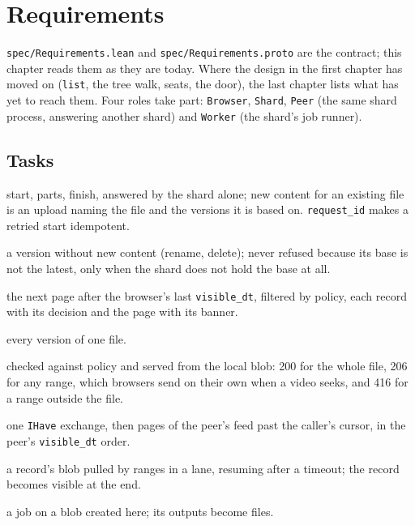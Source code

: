 \documentclass[11pt,oneside]{book}
\providecommand{\tightlist}{\setlength{\itemsep}{0pt}\setlength{\parskip}{0pt}}
\begin{document}


\chapter{Requirements}
\texttt{spec/Requirements.lean} and \texttt{spec/Requirements.proto} are the
contract; this chapter reads them as they are today. Where the design in the
first chapter has moved on (\texttt{list}, the tree walk, seats, the door), the
last chapter lists what has yet to reach them. Four roles take part: \texttt{Browser},
\texttt{Shard}, \texttt{Peer} (the same shard process, answering another shard)
and \texttt{Worker} (the shard's job runner).

\section{Tasks}
\begin{description}\tightlist
\item[\texttt{upload}] start, parts, finish, answered by the shard alone; new
  content for an existing file is an upload naming the file and the versions it is
  based on. \texttt{request\_id} makes a retried start idempotent.
\item[\texttt{update}] a version without new content (rename, delete); never
  refused because its base is not the latest, only when the shard does not hold
  the base at all.
\item[\texttt{feed}] the next page after the browser's last \texttt{visible\_dt},
  filtered by policy, each record with its decision and the page with its banner.
\item[\texttt{history}] every version of one file.
\item[\texttt{download}] checked against policy and served from the local blob:
  200 for the whole file, 206 for any range, which browsers send on their own
  when a video seeks, and 416 for a range outside the file.
\item[\texttt{replicate}] one \texttt{IHave} exchange, then pages of the peer's
  feed past the caller's cursor, in the peer's \texttt{visible\_dt} order.
\item[\texttt{import}] a record's blob pulled by ranges in a lane, resuming after
  a timeout; the record becomes visible at the end.
\item[\texttt{derive}] a job on a blob created here; its outputs become files.
\end{description}
\end{document}
